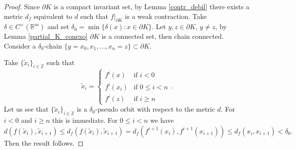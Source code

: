 \documentclass{amsart}
\newcommand{\R}{{\mathbb{R}}}
\newcommand{\Z}{{\mathbb{Z}}}
\def\blacksquare{\hbox{\vrule width 4pt height 4pt depth 0pt}}
\def\qed{\ \ \ \hbox{}\nolinebreak\hfill $\blacksquare \  \  \  \  $ \par{}\medskip}
\begin{document}
	\begin{proof}	
		Since $\partial K$ is a compact invariant set, by Lemma \ref{contr_debil} there exists a metric $d_f$ equivalent to $d$ such that $f|_{\partial K}$ is a weak contraction.  Take $\delta\in C^+(\R^m)$ and set $\delta_0=\min\{\delta(x): x\in \partial K\}$. Let $y, z\in \partial K$, $y\neq z$,  by Lemma \ref{partial_K_conexo} $\partial K$ is a connected set, then chain connected. Consider a $\delta_0$-chain $\{y=x_0, x_1,\ldots, x_n=z\}\subset \partial K$. 
		
		Take $\{\tilde{x}_i\}_{i\in \Z}$ such that $$\tilde{x}_i=\begin{cases} f^i(x)&\mbox{if } i<0\\f^i(x_i)&\mbox{if } 0\leq i<n\\ f^i(z)& \mbox{if } i\geq n\end{cases}.$$ Let us see that 
		$\{\tilde{x}_i\}_{i\in \Z}$ is a $\delta_0$-pseudo orbit with respect  to the metric $d$. For $i<0$ and $i\geq n$ this is immediate. For $0\leq i<n$ we have 	$$d(f(\tilde{x}_i), \tilde{x}_{i+1})\leq d_f(f(\tilde{x}_i), \tilde{x}_{i+1})=d_f(f^{i+1}(x_i), f^{i+1}(x_{i+1}))\leq d_f(x_i, x_{i+1})<\delta_0.$$ Then the result follows.		
	\end{proof}
	
	
	
\end{document}
